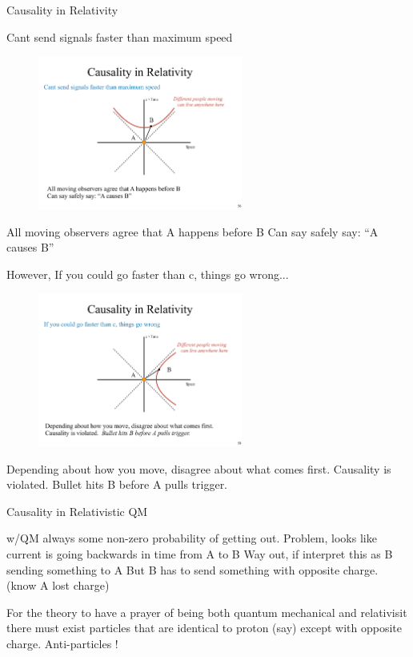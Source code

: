 Causality in Relativity

Cant send signals faster than maximum speed
\begin{figure}[h]
\centering
\includegraphics[width=0.6\textwidth]{./CausalityTimelike.pdf}
\end{figure}
All moving observers agree that A happens before B Can say safely say: ``A causes B''


However, If you could go faster than c, things go wrong...
\begin{figure}[h]
\centering
\includegraphics[width=0.6\textwidth]{./CausalitySpacelike.pdf}
\end{figure}
Depending about how you move, disagree about what comes first. Causality is violated. Bullet hits B before A pulls trigger.

Causality in Relativistic QM

w/QM always some non-zero probability of getting out.
Problem, looks like current is going backwards in time from A to B
Way out, if interpret this as B sending something to A
But B has to send something with opposite charge. (know A lost charge)


For the theory to have a prayer of being both quantum mechanical and relativisit there must exist particles that are identical to proton (say) except with opposite charge.
Anti-particles !


